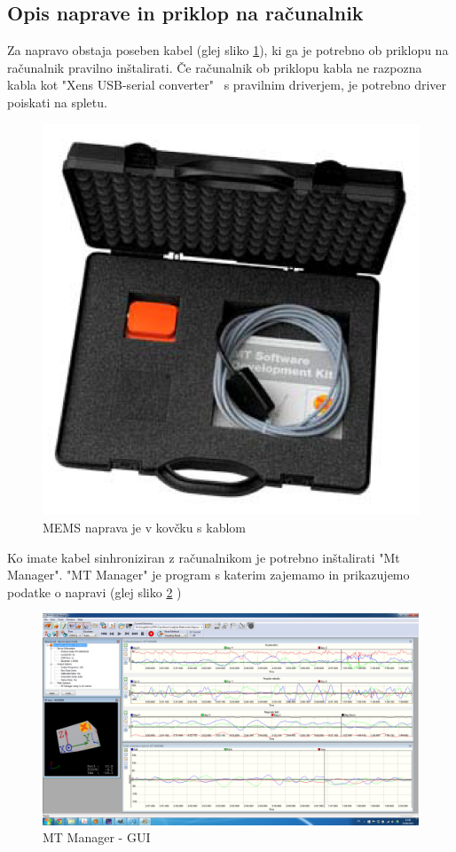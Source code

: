 \subsection{Opis naprave in priklop na računalnik}
Za napravo obstaja poseben kabel (glej sliko \ref{fig:v_mems_kit}), ki ga je potrebno ob priklopu na računalnik pravilno inštalirati. Če računalnik ob priklopu kabla ne razpozna kabla kot "Xens USB-serial converter" ~s pravilnim driverjem, je potrebno driver poiskati na spletu.

\begin{figure}[!h]
	\centering \includegraphics[width=12cm]{Vaje/ManevrZMems/figs/kit.png}
	\caption{MEMS naprava je v kovčku s kablom}
	\label{fig:v_mems_kit}
\end{figure}

Ko imate kabel sinhroniziran z računalnikom je potrebno inštalirati "Mt Manager". "MT Manager" je program s katerim zajemamo in prikazujemo podatke o napravi (glej sliko \ref{fig:v_mems_mt_gui} ) 

\begin{figure}[!h]
	\centering \includegraphics[width=12cm]{Vaje/ManevrZMems/figs/mt_manager_gui.png}
	\caption{MT Manager - GUI}
	\label{fig:v_mems_mt_gui}
\end{figure}

